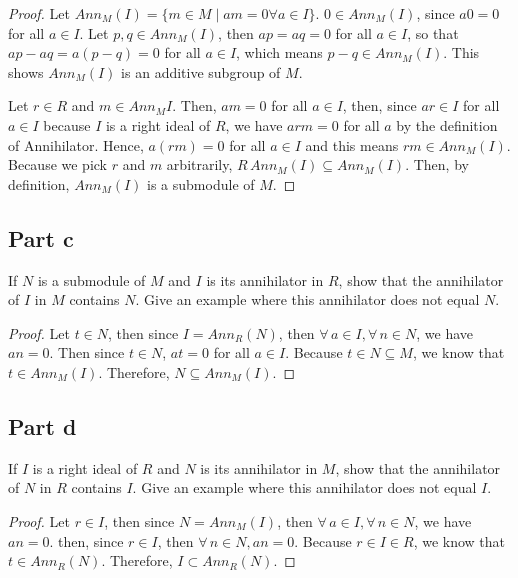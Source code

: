 \begin{answer}
    \begin{proof}
        Let $Ann_M(I) = \{m \in M \mid a m=0 \forall a \in I\}$. $0 \in Ann_{M}(I)$, since $a0 = 0$ for all $a \in I$. Let $p,q \in Ann_M(I)$, then $ap = aq = 0$ for all $a \in I$, so that $ap - aq = a(p-q) = 0$ for all $a \in I$, which means $p-q \in Ann_{M}(I)$. This shows $Ann_M(I)$ is an additive subgroup of $M$.
        
        Let $r \in R$ and $m \in Ann_M{I}$. Then, $am = 0$ for all $a \in I$, then, since $ar \in I$ for all $a \in I$ because $I$ is a right ideal of $R$, we have $arm = 0$ for all $a$ by the definition of Annihilator. Hence, $a(rm) = 0$ for all $a \in I$ and this means $rm \in Ann_M(I)$. Because we pick $r$ and $m$ arbitrarily, $R\,Ann_M(I) \subseteq Ann_M(I)$. Then, by definition, $Ann_M(I)$ is a submodule of $M$.
    \end{proof}
\end{answer}

\subsection{Part c}

\begin{question}
    If $N$ is a submodule of $M$ and $I$ is its annihilator in $R$, show that the annihilator of $I$ in $M$ contains $N$. Give an example where this annihilator does not equal $N$.
\end{question}

\begin{answer}
    \begin{proof}
        Let $t \in N$, then since $I = Ann_R(N)$, then $\forall\, a \in I, \forall \, n \in N$, we have $an = 0$. Then since $t \in N$, $at = 0$ for all $a \in I$. Because $t \in N \subseteq M$, we know that $t \in Ann_M(I)$. Therefore, $N \subseteq Ann_M(I)$.
    \end{proof}
\end{answer}

\subsection{Part d}

\begin{question}
    If $I$ is a right ideal of $R$ and $N$ is its annihilator in $M$, show that the annihilator of $N$ in $R$ contains $I$. Give an example where this annihilator does not equal $I$.
\end{question}

\begin{answer}
    \begin{proof}
        Let $r \in I$, then since $N = Ann_M(I)$, then $\forall\, a \in I, \forall \, n \in N$, we have $an = 0$. then, since $r \in I$, then $\forall \, n \in N, an = 0$. Because $r \in I \in R$, we know that $t \in Ann_R(N)$. Therefore, $I \subset Ann_R(N)$.
    \end{proof}
\end{answer}